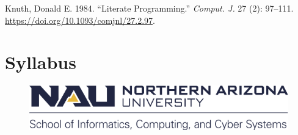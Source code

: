 \documentclass[
  letterpaper,
  DIV=11,
  numbers=noendperiod]{scrreprt}
\newlength{\cslhangindent}
\newlength{\cslentryspacingunit} %
\newenvironment{CSLReferences}[2] %
 {%
  \setlength{\parindent}{0pt}
  \ifodd #1
  \let\oldpar\par
  \def\par{\hangindent=\cslhangindent\oldpar}
  \fi
  \setlength{\parskip}{#2\cslentryspacingunit}
 }%
 {}
\begin{document}
\hypertarget{refs}{}
\begin{CSLReferences}{1}{0}
\leavevmode{}%
Knuth, Donald E. 1984. {``Literate Programming.''} \emph{Comput. J.} 27
(2): 97--111. \url{https://doi.org/10.1093/comjnl/27.2.97}.

\end{CSLReferences}

\appendix
{}

\hypertarget{sec-syllabus}{%
\chapter{Syllabus}\label{sec-syllabus}}

\begin{figure}

{\centering \includegraphics{./images/nau_siccs_logo.png}

}

\end{figure}
\end{document}

